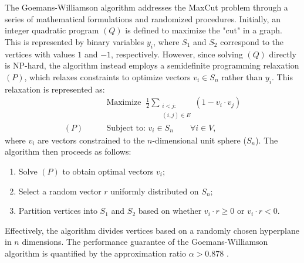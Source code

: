 The Goemans-Williamson algorithm addresses the MaxCut problem through a series of mathematical formulations and randomized procedures. Initially, an integer quadratic program \( (Q) \) is defined to maximize the "cut" in a graph. This is represented by binary variables \( y_i \), where \( S_1 \) and \( S_2 \) correspond to the vertices with values $1$ and $-1$, respectively. However, since solving \( (Q) \) directly is NP-hard, the algorithm instead employs a semidefinite programming relaxation \( (P) \), which relaxes constraints to optimize vectors \( v_i \in S_n \) rather than \( y_i \). This relaxation is represented as:
\begin{equation}\tag{5}
    \begin{aligned}
        &\text{Maximize}\;\;\frac{1}{2}\sum_{\substack{i < j: \\ (i,j)\in E}}(1-v_{i} \cdot v_{j}) \\
        (P)\qquad&\text{Subject to: }v_{i}\in S_n \qquad\forall i\in V,
    \end{aligned}
\end{equation}
where \( v_i \) are vectors constrained to the \( n \)-dimensional unit sphere ($S_n$). The algorithm then proceeds as follows:
\begin{enumerate}
    \item Solve \( (P) \) to obtain optimal vectors \( v_i \);
    \item Select a random vector \( r \) uniformly distributed on $S_n$;
    \item Partition vertices into \( S_1 \) and \( S_2 \) based on whether \( v_i \cdot r \geq 0 \) or \( v_i \cdot r < 0 \).
\end{enumerate}
Effectively, the algorithm divides vertices based on a randomly chosen hyperplane in \( n \) dimensions. The performance guarantee of the Goemans-Williamson algorithm is quantified by the approximation ratio \( \alpha > 0.878 \) \cite{GW-Algorithm}.


